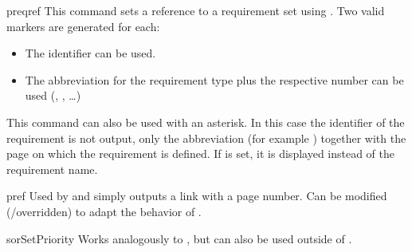 \documentclass{sopra-base}
\begin{document}
\begin{command}{preqref}{}
    This command sets a reference to a requirement set using . Two valid markers are generated for each: \begin{itemize}\setlength{\itemsep}{0pt}
        \item The identifier can be used.
        \item The abbreviation for the requirement type plus the respective number can be used (, , \ldots)
    \end{itemize}
    This command can also be used with an asterisk. In this case the
    identifier of the requirement is not output, only the abbreviation (for example ) together with the page on which the requirement is defined. If  is set,
    it is displayed instead of the requirement name.
\end{command}

\begin{command}{pref}{}
    Used by  and simply outputs a link with a page number.
    Can be modified (/overridden) to adapt the behavior of .
\end{command}

\begin{command}{sorSetPriority}{}
    Works analogously to , but can also be used outside of .
\end{command}
\end{document}
